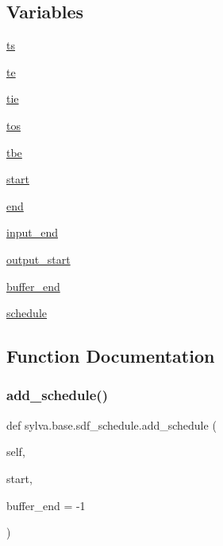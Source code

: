 \subsection*{Variables}
\begin{DoxyCompactItemize}
\item 
\hyperlink{namespacesylva_1_1base_1_1sdf__schedule_a3211292951ee227eb812ad46385a4153}{ts}
\item 
\hyperlink{namespacesylva_1_1base_1_1sdf__schedule_aa891c7d89f3a7107565314393c569ff7}{te}
\item 
\hyperlink{namespacesylva_1_1base_1_1sdf__schedule_aac8675a2e3a0b9a53b3dfff041b38fa9}{tie}
\item 
\hyperlink{namespacesylva_1_1base_1_1sdf__schedule_a49b15ca1056f29daaaef0cb8acbce98c}{tos}
\item 
\hyperlink{namespacesylva_1_1base_1_1sdf__schedule_a2c33f9687bbbab33c40116ada869ca04}{tbe}
\item 
\hyperlink{namespacesylva_1_1base_1_1sdf__schedule_a3f7278d0453c1de2ab036bd4d0cc6c34}{start}
\item 
\hyperlink{namespacesylva_1_1base_1_1sdf__schedule_ae4cd61d6bd60aac9bb906e858fa30117}{end}
\item 
\hyperlink{namespacesylva_1_1base_1_1sdf__schedule_abc4d31ff32efd2d4fa3fa7b5d6dde951}{input\+\_\+end}
\item 
\hyperlink{namespacesylva_1_1base_1_1sdf__schedule_ad117e7a828ef2b1cbf49939fd17fe5e5}{output\+\_\+start}
\item 
\hyperlink{namespacesylva_1_1base_1_1sdf__schedule_a04c239d8283f1618f063ef92036c8c4c}{buffer\+\_\+end}
\item 
\hyperlink{namespacesylva_1_1base_1_1sdf__schedule_a8b197ace520c46393d20db7c5e1228e8}{schedule}
\end{DoxyCompactItemize}


\subsection{Function Documentation}
\mbox{\label{namespacesylva_1_1base_1_1sdf__schedule_af3610c48a92beceb09c2924f3554663e}} 
\subsubsection{\texorpdfstring{add\+\_\+schedule()}{add\_schedule()}}
{\footnotesize\ttfamily def sylva.\+base.\+sdf\+\_\+schedule.\+add\+\_\+schedule (\begin{DoxyParamCaption}\item[{}]{self,  }\item[{}]{start,  }\item[{}]{buffer\+\_\+end = {\ttfamily -\/1} }\end{DoxyParamCaption})}

